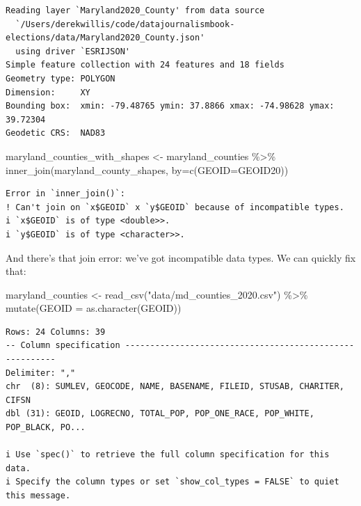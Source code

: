 \documentclass[
  letterpaper,
  DIV=11,
  numbers=noendperiod]{scrreprt}
\newenvironment{Shaded}{\begin{snugshade}}{\end{snugshade}}
\newcommand{\AttributeTok}[1]{\textcolor[rgb]{0.40,0.45,0.13}{#1}}
\newcommand{\FunctionTok}[1]{\textcolor[rgb]{0.28,0.35,0.67}{#1}}
\newcommand{\NormalTok}[1]{\textcolor[rgb]{0.00,0.23,0.31}{#1}}
\newcommand{\OtherTok}[1]{\textcolor[rgb]{0.00,0.23,0.31}{#1}}
\newcommand{\SpecialCharTok}[1]{\textcolor[rgb]{0.37,0.37,0.37}{#1}}
\newcommand{\StringTok}[1]{\textcolor[rgb]{0.13,0.47,0.30}{#1}}
\begin{document}
\begin{verbatim}
Reading layer `Maryland2020_County' from data source 
  `/Users/derekwillis/code/datajournalismbook-elections/data/Maryland2020_County.json' 
  using driver `ESRIJSON'
Simple feature collection with 24 features and 18 fields
Geometry type: POLYGON
Dimension:     XY
Bounding box:  xmin: -79.48765 ymin: 37.8866 xmax: -74.98628 ymax: 39.72304
Geodetic CRS:  NAD83
\end{verbatim}

\begin{Shaded}
\begin{Highlighting}[]
\NormalTok{maryland\_counties\_with\_shapes }\OtherTok{\textless{}{-}}\NormalTok{ maryland\_counties }\SpecialCharTok{\%\textgreater{}\%} \FunctionTok{inner\_join}\NormalTok{(maryland\_county\_shapes, }\AttributeTok{by=}\FunctionTok{c}\NormalTok{(}\StringTok{\textquotesingle{}GEOID\textquotesingle{}}\OtherTok{=}\StringTok{\textquotesingle{}GEOID20\textquotesingle{}}\NormalTok{))}
\end{Highlighting}
\end{Shaded}

\begin{verbatim}
Error in `inner_join()`:
! Can't join on `x$GEOID` x `y$GEOID` because of incompatible types.
i `x$GEOID` is of type <double>>.
i `y$GEOID` is of type <character>>.
\end{verbatim}

And there's that join error: we've got incompatible data types. We can
quickly fix that:

\begin{Shaded}
\begin{Highlighting}[]
\NormalTok{maryland\_counties }\OtherTok{\textless{}{-}} \FunctionTok{read\_csv}\NormalTok{(}\StringTok{"data/md\_counties\_2020.csv"}\NormalTok{) }\SpecialCharTok{\%\textgreater{}\%} \FunctionTok{mutate}\NormalTok{(}\AttributeTok{GEOID =} \FunctionTok{as.character}\NormalTok{(GEOID))}
\end{Highlighting}
\end{Shaded}

\begin{verbatim}
Rows: 24 Columns: 39
-- Column specification --------------------------------------------------------
Delimiter: ","
chr  (8): SUMLEV, GEOCODE, NAME, BASENAME, FILEID, STUSAB, CHARITER, CIFSN
dbl (31): GEOID, LOGRECNO, TOTAL_POP, POP_ONE_RACE, POP_WHITE, POP_BLACK, PO...

i Use `spec()` to retrieve the full column specification for this data.
i Specify the column types or set `show_col_types = FALSE` to quiet this message.
\end{verbatim}
\end{document}
